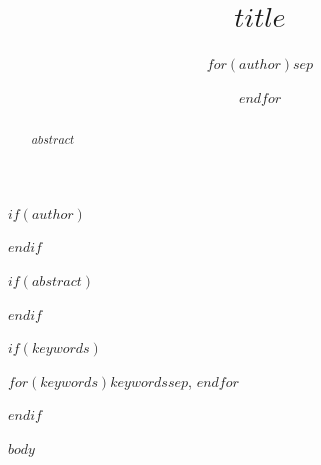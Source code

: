 \documentclass[conference]{IEEEtran}
\begin{document}
\title{$title$}

$if(author)$
\author{$for(author)$$sep$\and $endfor$}
$endif$

\maketitle

$if(abstract)$
\begin{abstract}
$abstract$
\end{abstract}
$endif$

$if(keywords)$
\begin{IEEEkeywords}
$for(keywords)$$keywords$$sep$, $endfor$
\end{IEEEkeywords}
$endif$

$body$
\end{document}

